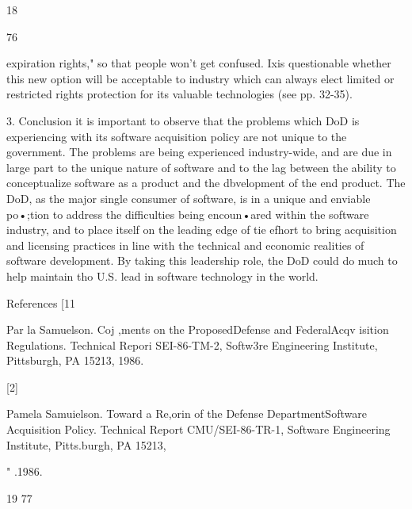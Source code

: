 \documentclass[12pt]{article}
\begin{document}
18

76

expiration rights," so that people won't get confused. Ixis questionable whether this new option will
be acceptable to industry which can always elect limited or restricted rights protection for its valuable
technologies (see pp. 32-35).

3. Conclusion
it is important to observe that the problems which DoD is experiencing with its software acquisition
policy are not unique to the government. The problems are being experienced industry-wide, and are
due in large part to the unique nature of software and to the lag between the ability to conceptualize
software as a product and the dbvelopment of the end product. The DoD, as the major single
consumer of software, is in a unique and enviable po•;tion to address the difficulties being encoun•ared within the software industry, and to place itself on the leading edge of tie efhort to bring acquisition and licensing practices in line with the technical and economic realities of software development.
By taking this leadership role, the DoD could do much to help maintain tho U.S. lead in software
technology in the world.

References
[11

Par la Samuelson.
Coj ,ments on the ProposedDefense and FederalAcqv isition Regulations.
Technical Repori SEI-86-TM-2, Softw3re Engineering Institute, Pittsburgh, PA 15213, 1986.

[2]

Pamela Samuielson.
Toward a Re,orin of the Defense DepartmentSoftware Acquisition Policy.
Technical Report CMU/SEI-86-TR-1, Software Engineering Institute, Pitts.burgh, PA 15213,

" .1986.

19
77
\end{document}
